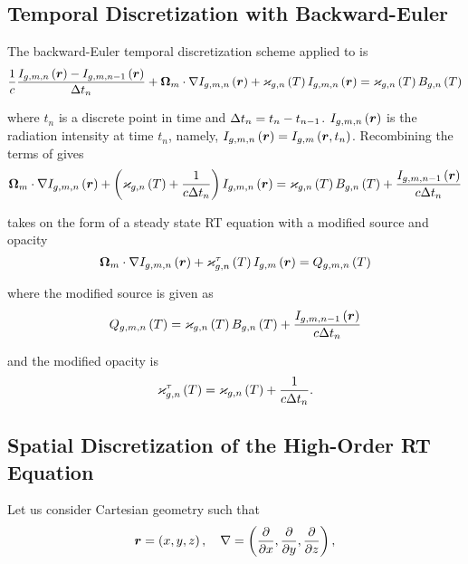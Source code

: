 \subsection{Temporal Discretization with Backward-Euler} \label{rte_time_disc}
	The backward-Euler temporal discretization scheme applied to  is
	\begin{equation}
		\frac{1}{c}\frac{I_{g,m,n}\left(\bm{r}\right) - I_{g,m,n-1}\left(\bm{r}\right)}{\Delta t_n} + \bm{\Omega}_m\cdot\nabla I_{g,m,n}\left(\bm{r}\right) + \varkappa_{g,n}\left( T\right)I_{g,m,n}\left(\bm{r}\right) = \varkappa_{g,n}\left( T\right)B_{g,n}\left( T\right) \label{BE_RTE}
	\end{equation}
	
	where $t_n$ is a discrete point in time and $\Delta t_n = t_n - t_{n-1}$. $I_{g,m,n}\left(\bm{r}\right)$ is the radiation intensity at time $t_n$, namely, $I_{g,m,n}\left(\bm{r}\right) = I_{g,m}\left(\bm{r},t_n\right)$. Recombining the terms of  gives
	\begin{equation}
		\bm{\Omega}_m\cdot\nabla I_{g,m,n}\left(\bm{r}\right) + \left( \varkappa_{g,n}\left( T\right) + \frac{1}{c\Delta t_n} \right)I_{g,m,n}\left(\bm{r}\right) = \varkappa_{g,n}\left( T\right)B_{g,n}\left( T\right) + \frac{I_{g,m,n-1}\left(\bm{r}\right)}{c\Delta t_n} \label{BE_RTE_2}
	\end{equation}
	
	 takes on the form of a steady state RT equation with a modified source and opacity
	\begin{equation}
		\bm{\Omega}_m\cdot\nabla I_{g,m,n}\left(\bm{r}\right) + \varkappa_{g,n}^\tau\left( T\right)I_{g,m}\left(\bm{r}\right) = Q_{g,m,n}\left( T\right)
	\end{equation}
	
	where the modified source is given as
	\begin{equation}
		Q_{g,m,n}\left( T\right) = \varkappa_{g,n}\left( T\right)B_{g,n}\left( T\right) + \frac{I_{g,m,n-1}\left(\bm{r}\right)}{c\Delta t_n} \label{modified_source}
	\end{equation}
	
	and the modified opacity is
	\begin{equation}
		\varkappa_{g,n}^\tau\left( T\right) = \varkappa_{g,n}\left( T\right) + \frac{1}{c\Delta t_n}. \label{modified_kap}
	\end{equation}

\subsection{Spatial Discretization of the High-Order RT Equation}
	Let us consider Cartesian geometry such that
	\begin{equation}
		\bm{r} = \left( x, y, z\right), \quad \nabla = \left(\frac{\partial }{\partial x}, \frac{\partial }{\partial y}, \frac{\partial }{\partial z}\right), \label{cartesian}
	\end{equation}
	
